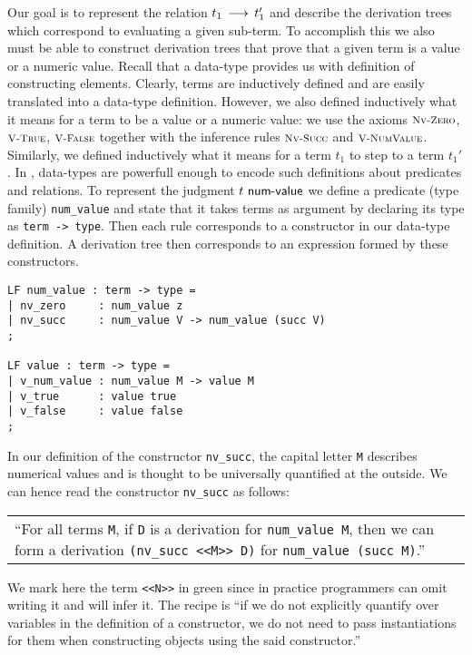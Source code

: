 Our  goal  is  to  represent  the  relation  $t_1 \mathrel{\,\longrightarrow\,} t_1'$ and  describe the
derivation trees which correspond to evaluating a given sub-term.
To accomplish this we also must be able to construct derivation trees that prove
that  a given  term is  a value  or a  numeric  value. Recall  that a  data-type
provides us with definition of constructing elements.
Clearly,  terms  are  inductively  defined  and  are  easily  translated  into a
data-type definition. However,  we also defined inductively  what it means for a
term  to be a value or a numeric value:  we use the  axioms $\textsc{\footnotesize Nv-Zero}$, $\textsc{\footnotesize V-True}$,
$\textsc{\footnotesize V-False}$  together  with  the   inference  rules  $\textsc{\footnotesize Nv-Succ}$  and  $\textsc{\footnotesize V-NumValue}$.
Similarly,  we defined inductively  what it means for a term $t_1$  to step to a
term $t_1'$.
In \beluga, data-types are powerfull enough to encode such definitions
about  predicates  and  relations.  To represent the judgment  $t ~\textsf{num-value}$  we
define  a predicate (type family) \lstinline!num_value!  and state that it takes
terms as argument  by declaring its type as \lstinline!term -> type!.  Then each
rule corresponds to a constructor in our data-type definition. A derivation tree
then corresponds to an expression formed by these constructors.

\begin{lstlisting}
LF num_value : term -> type =
| nv_zero     : num_value z
| nv_succ     : num_value V -> num_value (succ V)
;

LF value : term -> type =
| v_num_value : num_value M -> value M
| v_true      : value true
| v_false     : value false
;
\end{lstlisting}

In our definition  of  the constructor \lstinline!nv_succ!, the  capital  letter
\lstinline!M! describes numerical values and is thought  to be  universally
quantified  at the outside.  We can hence read the constructor \lstinline!nv_succ! as follows:

\begin{center}
\begin{tabular}{p{12cm}}
``For  all  terms   \lstinline$M$,   if   \lstinline!D!  is  a  derivation   for
\lstinline!num_value M!,      then      we     can     form     a     derivation
\lstinline!(nv_succ <<M>> D)! for \lstinline!num_value (succ M)!.''
\end{tabular}
\end{center}


We mark here  the term \lstinline!<<N>>! in green  since in practice programmers
can omit  writing it  and \beluga  will infer it.  The recipe is  ``if we do not
explicitly quantify over variables in the definition of a constructor, we do not
need  to pass instantiations  for them when constructing objects  using the said
constructor.''

